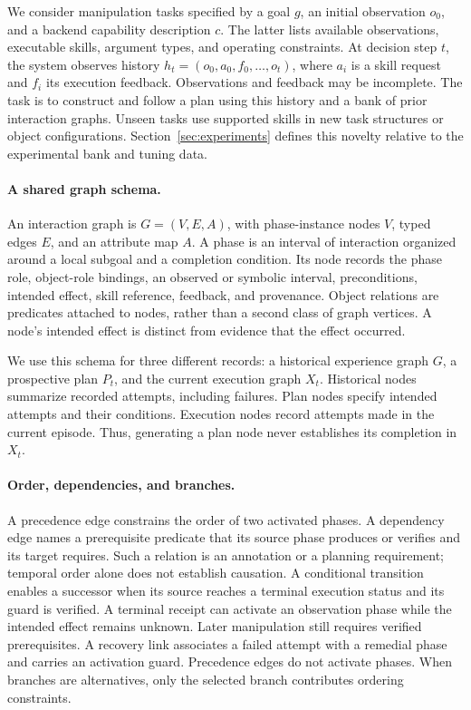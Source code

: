 \documentclass[10pt,twocolumn,letterpaper]{article}
\begin{document}
We consider manipulation tasks specified by a goal $g$, an initial observation $o_0$, and a backend capability description $c$. The latter lists available observations, executable skills, argument types, and operating constraints. At decision step $t$, the system observes history $h_t=(o_0,a_0,f_0,\ldots,o_t)$, where $a_i$ is a skill request and $f_i$ its execution feedback. Observations and feedback may be incomplete. The task is to construct and follow a plan using this history and a bank of prior interaction graphs. Unseen tasks use supported skills in new task structures or object configurations. Section~\ref{sec:experiments} defines this novelty relative to the experimental bank and tuning data.

\paragraph{A shared graph schema.}
An interaction graph is $G=(V,E,A)$, with phase-instance nodes $V$, typed edges $E$, and an attribute map $A$. A phase is an interval of interaction organized around a local subgoal and a completion condition. Its node records the phase role, object-role bindings, an observed or symbolic interval, preconditions, intended effect, skill reference, feedback, and provenance. Object relations are predicates attached to nodes, rather than a second class of graph vertices. A node's intended effect is distinct from evidence that the effect occurred.

We use this schema for three different records: a historical experience graph $G$, a prospective plan $P_t$, and the current execution graph $X_t$. Historical nodes summarize recorded attempts, including failures. Plan nodes specify intended attempts and their conditions. Execution nodes record attempts made in the current episode. Thus, generating a plan node never establishes its completion in $X_t$.

\paragraph{Order, dependencies, and branches.}
A precedence edge constrains the order of two activated phases. A dependency edge names a prerequisite predicate that its source phase produces or verifies and its target requires. Such a relation is an annotation or a planning requirement; temporal order alone does not establish causation. A conditional transition enables a successor when its source reaches a terminal execution status and its guard is verified. A terminal receipt can activate an observation phase while the intended effect remains unknown. Later manipulation still requires verified prerequisites. A recovery link associates a failed attempt with a remedial phase and carries an activation guard. Precedence edges do not activate phases. When branches are alternatives, only the selected branch contributes ordering constraints.
\end{document}
